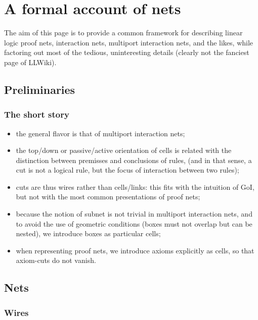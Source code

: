 \section{A formal account of nets}\label{a-formal-account-of-nets}

The aim of this page is to provide a common framework for describing
linear logic proof nets, interaction nets, multiport interaction nets,
and the likes, while factoring out most of the tedious, uninteresting
details (clearly not the fanciest page of LLWiki).

\subsection{Preliminaries}\label{preliminaries}

\subsubsection{The short story}\label{the-short-story}

\begin{itemize}
\tightlist
\item
  the general flavor is that of multiport interaction nets;
\item
  the top/down or passive/active orientation of cells is related with
  the distinction between premisses and conclusions of rules, (and in
  that sense, a cut is not a logical rule, but the focus of interaction
  between two rules);
\item
  cuts are thus wires rather than cells/links: this fits with the
  intuition of GoI, but not with the most common presentations of proof
  nets;
\item
  because the notion of subnet is not trivial in multiport interaction
  nets, and to avoid the use of geometric conditions (boxes must not
  overlap but can be nested), we introduce boxes as particular cells;
\item
  when representing proof nets, we introduce axioms explicitly as cells,
  so that axiom-cuts do not vanish.
\end{itemize}

\subsection{Nets}\label{nets}

\subsubsection{Wires}\label{wires}


